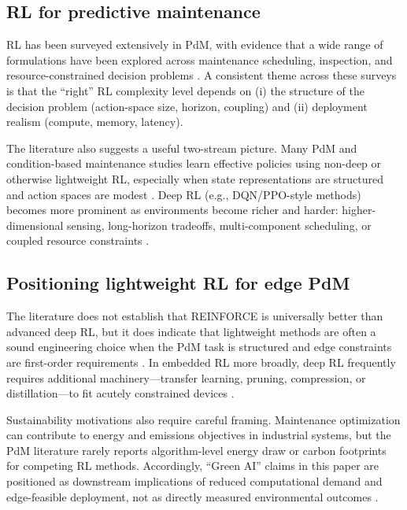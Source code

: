 \documentclass[sn-basic]{sn-jnl} %
\begin{document}
\subsection{RL for predictive maintenance}
RL has been surveyed extensively in PdM, with evidence that a wide range of formulations have been explored across maintenance scheduling, inspection, and resource-constrained decision problems \cite{Siraskar2023, Ogunfowora2023, Zhang2024}. A consistent theme across these surveys is that the ``right'' RL complexity level depends on (i) the structure of the decision problem (action-space size, horizon, coupling) and (ii) deployment realism (compute, memory, latency).

The literature also suggests a useful two-stream picture. Many PdM and condition-based maintenance studies learn effective policies using non-deep or otherwise lightweight RL, especially when state representations are structured and action spaces are modest \cite{Adsule2020, Yousefi2020, Rasay2024, Dadash2024}. Deep RL (e.g., DQN/PPO-style methods) becomes more prominent as environments become richer and harder: higher-dimensional sensing, long-horizon tradeoffs, multi-component scheduling, or coupled resource constraints \cite{Liu2020, Chen2023, Lee2022, Ong2022-02}.

\subsection{Positioning lightweight RL for edge PdM}
The literature does not establish that REINFORCE is universally better than advanced deep RL, but it does indicate that lightweight methods are often a sound engineering choice when the PdM task is structured and edge constraints are first-order requirements \cite{Compare2020, Njor2024, Pandey2023}. In embedded RL more broadly, deep RL frequently requires additional machinery---transfer learning, pruning, compression, or distillation---to fit acutely constrained devices \cite{Jang2020, Szydlo2022, Xu2022}.

Sustainability motivations also require careful framing. Maintenance optimization can contribute to energy and emissions objectives in industrial systems, but the PdM literature rarely reports algorithm-level energy draw or carbon footprints for competing RL methods. Accordingly, ``Green AI'' claims in this paper are positioned as downstream implications of reduced computational demand and edge-feasible deployment, not as directly measured environmental outcomes \cite{Banyai2021, Banyai2022, JasiulewiczKaczmarek2024}.
\end{document}

